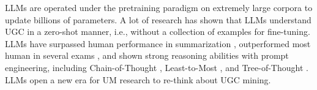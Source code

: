 \documentclass[11pt]{article}
\begin{document}
LLMs are operated under the pretraining paradigm on extremely large corpora to update billions of parameters. A lot of research has shown that LLMs understand UGC in a zero-shot manner, i.e., without a collection of examples for fine-tuning. LLMs have surpassed human performance in summarization \cite{pu2023summarization}, outperformed most human in several exams \cite{openai2023gpt4}, and shown strong reasoning abilities with prompt engineering, including Chain-of-Thought \cite{wei2022chain}, Least-to-Most \cite{zhou2022least}, and Tree-of-Thought \cite{yao2023tree}. LLMs open a new era for UM research to re-think about UGC mining.
\end{document}
